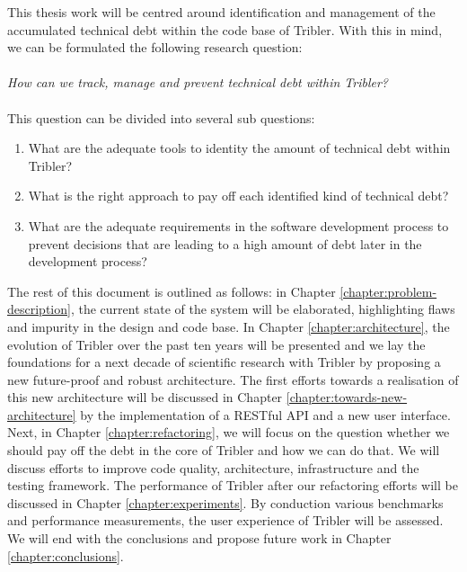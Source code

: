 This thesis work will be centred around identification and management of the accumulated technical debt within the code base of Tribler. With this in mind, we can be formulated the following research question:\\\\
\emph{How can we track, manage and prevent technical debt within Tribler?}\\\\
This question can be divided into several sub questions:
\begin{enumerate}
	\item What are the adequate tools to identity the amount of technical debt within Tribler?
	\item What is the right approach to pay off each identified kind of technical debt?
	\item What are the adequate requirements in the software development process to prevent decisions that are leading to a high amount of debt later in the development process?
\end{enumerate}
The rest of this document is outlined as follows: in Chapter \ref{chapter:problem-description}, the current state of the system will be elaborated, highlighting flaws and impurity in the design and code base. 
In Chapter \ref{chapter:architecture}, the evolution of Tribler over the past ten years will be presented and we lay the foundations for a next decade of scientific research with Tribler by proposing a new future-proof and robust architecture.
The first efforts towards a realisation of this new architecture will be discussed in Chapter \ref{chapter:towards-new-architecture} by the implementation of a RESTful API and a new user interface. Next, in Chapter \ref{chapter:refactoring}, we will focus on the question whether we should pay off the debt in the core of Tribler and how we can do that. 
We will discuss efforts to improve code quality, architecture, infrastructure and the testing framework.
The performance of Tribler after our refactoring efforts will be discussed in Chapter \ref{chapter:experiments}.
By conduction various benchmarks and performance measurements, the user experience of Tribler will be assessed.
We will end with the conclusions and propose future work in Chapter \ref{chapter:conclusions}.
